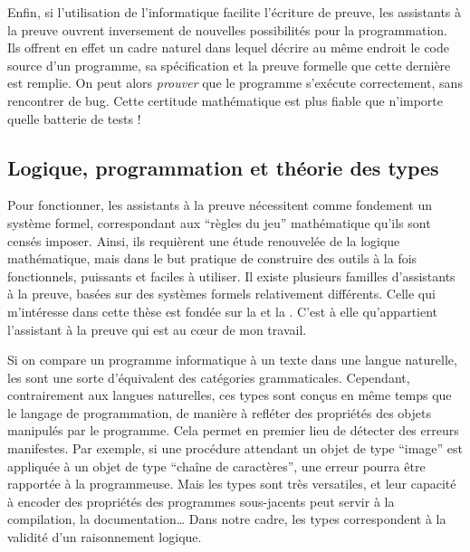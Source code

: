 Enfin, si l’utilisation de l’informatique facilite l’écriture de preuve,
les assistants à la preuve ouvrent inversement
de nouvelles possibilités pour la programmation.
Ils offrent en effet un cadre naturel dans lequel décrire au même endroit
le code source d’un programme, sa spécification et la preuve formelle que cette 
dernière est remplie. On peut alors \emph{prouver} que le
programme s’exécute correctement, sans rencontrer de bug.
Cette certitude mathématique est plus fiable que n’importe quelle batterie de tests !


\subsection{Logique, programmation et théorie des types}

Pour fonctionner, les assistants à la preuve nécessitent comme fondement un système
formel, correspondant aux “règles du jeu” mathématique qu’ils sont censés imposer.
Ainsi, ils requièrent une étude renouvelée de la logique mathématique, mais dans le but
pratique de construire des outils à la fois fonctionnels,
puissants et faciles à utiliser.
Il existe plusieurs familles d’assistants à la preuve, basées sur des
systèmes formels relativement différents. Celle qui m’intéresse dans cette thèse
est fondée sur la 
et la .
C’est à elle qu’appartient l’assistant à la preuve  qui est au cœur de mon
travail.

Si on compare un programme informatique à un texte dans une langue naturelle,
les  sont une sorte d’équivalent des catégories grammaticales.
Cependant, contrairement aux langues naturelles, ces types sont conçus
en même temps que le langage de programmation,
de manière à refléter des propriétés des objets manipulés par le programme.
Cela permet en premier lieu de détecter des erreurs manifestes.
Par exemple, si une procédure attendant un objet de type “image” est
appliquée à un objet de type “chaîne de caractères”, une erreur pourra être rapportée
à la programmeuse.
Mais les types sont très versatiles, et leur capacité à encoder
des propriétés des programmes sous-jacents peut servir à la compilation, la
documentation… Dans notre cadre, les types correspondent à la
validité d’un raisonnement logique.

